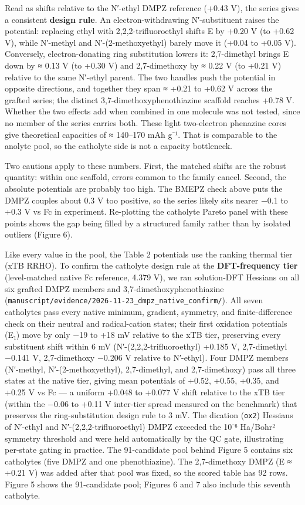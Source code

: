 \documentclass[journal=jcisd8,manuscript=article]{achemso}
\begin{document}
Read as shifts relative to the N′-ethyl DMPZ reference (+0.43 V), the series gives a consistent \textbf{design rule}. An electron-withdrawing N′-substituent raises the potential: replacing ethyl with 2,2,2-trifluoroethyl shifts E by +0.20 V (to +0.62 V), while N′-methyl and N′-(2-methoxyethyl) barely move it (+0.04 to +0.05 V). Conversely, electron-donating ring substitution lowers it: 2,7-dimethyl brings E down by ≈ 0.13 V (to +0.30 V) and 2,7-dimethoxy by ≈ 0.22 V (to +0.21 V) relative to the same N′-ethyl parent. The two handles push the potential in opposite directions, and together they span ≈ +0.21 to +0.62 V across the grafted series; the distinct 3,7-dimethoxyphenothiazine scaffold reaches +0.78 V. Whether the two effects add when combined in one molecule was not tested, since no member of the series carries both. These light two-electron phenazine cores give theoretical capacities of ≈ 140–170 mAh g⁻¹. That is comparable to the anolyte pool, so the catholyte side is not a capacity bottleneck.

Two cautions apply to these numbers. First, the matched shifts are the robust quantity: within one scaffold, errors common to the family cancel. Second, the absolute potentials are probably too high. The BMEPZ check above puts the DMPZ couples about 0.3 V too positive, so the series likely sits nearer −0.1 to +0.3 V vs Fc in experiment. Re-plotting the catholyte Pareto panel with these points shows the gap being filled by a structured family rather than by isolated outliers (Figure 6).

Like every value in the pool, the Table 2 potentials use the ranking thermal tier (xTB RRHO). To confirm the catholyte design rule at the \textbf{DFT-frequency tier} (level-matched native Fc reference, 4.379 V), we ran solution-DFT Hessians on all six grafted DMPZ members and 3,7-dimethoxyphenothiazine (\texttt{manuscript/evidence/2026-11-23\_dmpz\_native\_confirm/}). All seven catholytes pass every native minimum, gradient, symmetry, and finite-difference check on their neutral and radical-cation states; their first oxidation potentials (E₁) move by only −19 to +18 mV relative to the xTB tier, preserving every substituent shift within 6 mV (N′-(2,2,2-trifluoroethyl) +0.185 V, 2,7-dimethyl −0.141 V, 2,7-dimethoxy −0.206 V relative to N′-ethyl). Four DMPZ members (N′-methyl, N′-(2-methoxyethyl), 2,7-dimethyl, and 2,7-dimethoxy) pass all three states at the native tier, giving mean potentials of +0.52, +0.55, +0.35, and +0.25 V vs Fc — a uniform +0.048 to +0.077 V shift relative to the xTB tier (within the −0.06 to +0.11 V inter-tier spread measured on the benchmark) that preserves the ring-substitution design rule to 3 mV. The dication (\texttt{ox2}) Hessians of N′-ethyl and N′-(2,2,2-trifluoroethyl) DMPZ exceeded the 10⁻⁶ Ha/Bohr² symmetry threshold and were held automatically by the QC gate, illustrating per-state gating in practice. The 91-candidate pool behind Figure 5 contains six catholytes (five DMPZ and one phenothiazine). The 2,7-dimethoxy DMPZ (E ≈ +0.21 V) was added after that pool was fixed, so the scored table has 92 rows. Figure 5 shows the 91-candidate pool; Figures 6 and 7 also include this seventh catholyte.
\end{document}

